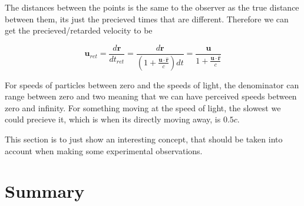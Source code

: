 The distances between the points is the same to the observer as the true distance between them, its just the precieved times that are different.
Therefore we can get the precieved/retarded velocity to be

\begin{equation}
	\mathbf{u}_{ret} = \frac{d\mathbf{r}}{dt_{ret}} = \frac{d\mathbf{r}}{ \left( 1 + \frac{ \mathbf{u} \cdot \hat{\mathbf{r}} }{ c} \right) dt } = \frac{\mathbf{u}}{ 1 + \frac{ \mathbf{u} \cdot \hat{\mathbf{r}} }{ c} }
\end{equation}

For speeds of particles between zero and the speeds of light, the denominator can range between zero and two meaning that we can have perceived speeds between zero and infinity.
For something moving at the speed of light, the slowest we could precieve it, which is when its directly moving away, is $0.5{c}$.

This section is to just show an interesting concept, that should be taken into account when making some experimental observations.





\section{Summary}

